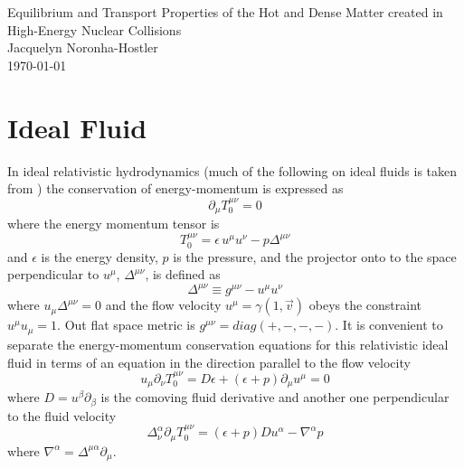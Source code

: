 \documentclass[aps,article]{revtex4}
\begin{document}
\begin{center}
\Large{\Huge  Equilibrium and Transport Properties of the Hot and Dense Matter created in High-Energy Nuclear Collisions\\}
\large{\Large  Jacquelyn Noronha-Hostler\\}
\today
\end{center}






\section{Ideal Fluid}


In ideal relativistic hydrodynamics (much of the following on ideal fluids is taken from \cite{Romatschke:2009im}) the conservation of energy-momentum is expressed as
\begin{equation}\label{eqn:idealconsv}
\partial_{\mu}T^{\mu\nu}_{0}=0
\end{equation}
where the energy momentum tensor is 
\begin{equation}
T^{\mu\nu}_{0}=\epsilon\, u^{\mu}u^{\nu}-p\Delta^{\mu\nu}
\end{equation}
and $\epsilon$ is the energy density, $p$ is the pressure, and the projector onto to the space perpendicular to $u^\mu$, $\Delta^{\mu\nu}$, is defined as
\begin{equation}
\Delta^{\mu\nu} \equiv g^{\mu\nu}-u^{\mu}u^{\nu}
\end{equation}
where $u_{\mu}\Delta^{\mu\nu}=0$ and the flow velocity $u^\mu=\gamma(1,\vec{v})$ obeys the constraint $u^{\mu}u_{\mu}=1$. 
Out flat space metric is $g^{\mu\nu}=diag(+,-,-,-)$. It is convenient to separate the energy-momentum conservation equations for this relativistic ideal fluid in terms of an equation in the direction parallel to the flow velocity 
\begin{equation}\label{eqn:idealpar}
\boxed{u_{\mu} \partial_{\nu}T^{\mu\nu}_{0}=D\epsilon+(\epsilon +p)\partial_{\mu}u^{\mu}=0}
\end{equation}
where $D=u^{\beta}\partial_{\beta}$ is the comoving fluid derivative and another one perpendicular to the fluid velocity
\begin{equation}\label{eqn:idealper}
\boxed{\Delta_{\nu}^{\alpha}\partial_{\mu}T^{\mu\nu}_{0}=(\epsilon +p)Du^{\alpha}-\nabla^{\alpha}p}
\end{equation}
where $\nabla^{\alpha}=\Delta^{\mu\alpha}\partial_{\mu} $.   
\end{document}
